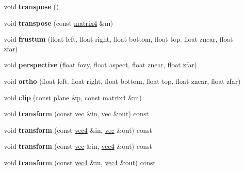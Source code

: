 \begin{DoxyCompactItemize}
void {\bfseries transpose} ()
\item 
\mbox{\label{structmatrix4_ae286bd9aec8651a3e8da22b7e7d78c43}} 
void {\bfseries transpose} (const \hyperlink{structmatrix4}{matrix4} \&m)
\item 
\mbox{\label{structmatrix4_a7f8e95c3b0543f0264784a8b5e069b1b}} 
void {\bfseries frustum} (float left, float right, float bottom, float top, float znear, float zfar)
\item 
\mbox{\label{structmatrix4_af85b8e46304de2dafdb5f32896681bda}} 
void {\bfseries perspective} (float fovy, float aspect, float znear, float zfar)
\item 
\mbox{\label{structmatrix4_a47fa9685bb6131fd246e8f23632f2819}} 
void {\bfseries ortho} (float left, float right, float bottom, float top, float znear, float zfar)
\item 
\mbox{\label{structmatrix4_af3f18132714a3c3acd7055f7bdfcff96}} 
void {\bfseries clip} (const \hyperlink{structplane}{plane} \&p, const \hyperlink{structmatrix4}{matrix4} \&m)
\item 
\mbox{\label{structmatrix4_a2ab2ad75cbbedc7635111bf0a5740461}} 
void {\bfseries transform} (const \hyperlink{structvec}{vec} \&in, \hyperlink{structvec}{vec} \&out) const
\item 
\mbox{\label{structmatrix4_a72a0cbea88a5f5289489462f1652b3de}} 
void {\bfseries transform} (const \hyperlink{structvec4}{vec4} \&in, \hyperlink{structvec}{vec} \&out) const
\item 
\mbox{\label{structmatrix4_a906328610653c1ff26aabe820820bcef}} 
void {\bfseries transform} (const \hyperlink{structvec}{vec} \&in, \hyperlink{structvec4}{vec4} \&out) const
\item 
\mbox{\label{structmatrix4_a188a3b1f16040b1f5d9006822f5682db}} 
void {\bfseries transform} (const \hyperlink{structvec4}{vec4} \&in, \hyperlink{structvec4}{vec4} \&out) const
\item 
\mbox{\label{structmatrix4_a3cf2f2de763b5da5fa999e797af00a5e}} 

\end{DoxyCompactItemize}
